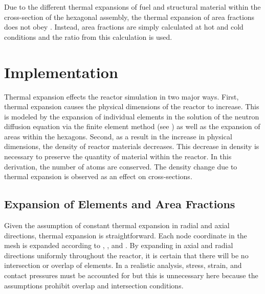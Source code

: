     Due to the different thermal expansions of fuel and structural material 
    within the cross-section of the hexagonal assembly, the thermal expansion of 
    area fractions does not obey . Instead, area 
    fractions are simply calculated at hot and cold conditions and the ratio 
    from this calculation is used.

\section{Implementation}
  Thermal expansion effects the reactor simulation in two major ways. First,
  thermal expansion causes the physical dimensions of the reactor to increase. 
  This is modeled by the expansion of individual elements in the solution of the
  neutron diffusion equation via the finite element method (see
  ) as well as the expansion of areas within the 
  hexagons.  Second, as a result in the increase in physical dimensions, the 
  density of reactor materials decreases. This decrease in density is necessary
  to preserve the quantity of material within the reactor. In this derivation,
  the number of atoms are conserved. The density change due to thermal expansion 
  is observed as an effect on cross-sections.

  \subsection{Expansion of Elements and Area Fractions}
    Given the assumption of constant thermal expansion in radial and axial
    directions, thermal expansion is straightforward. Each node coordinate in
    the mesh is expanded according to , ,
    and . By expanding in axial and radial directions
    uniformly throughout the reactor, it is certain that there will be no
    intersection or overlap of elements. In a realistic analysis, stress,
    strain, and contact pressures must be accounted for but this is unnecessary
    here because the assumptions prohibit overlap and intersection conditions.

